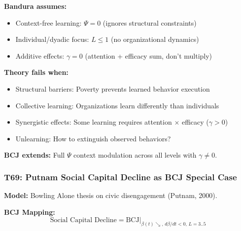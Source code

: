 \begin{tcolorbox}[colback=red!5!white, colframe=red!75!black,
    title=Boundary Condition: Where Bandura Fails]
\textbf{Bandura assumes:}
\begin{itemize}[nosep]
\item Context-free learning: $\Psi = 0$ (ignores structural constraints)
\item Individual/dyadic focus: $L \leq 1$ (no organizational dynamics)
\item Additive effects: $\gamma = 0$ (attention + efficacy sum, don't multiply)
\end{itemize}

\textbf{Theory fails when:}
\begin{itemize}[nosep]
\item Structural barriers: Poverty prevents learned behavior execution
\item Collective learning: Organizations learn differently than individuals
\item Synergistic effects: Some learning requires attention $\times$ efficacy ($\gamma > 0$)
\item Unlearning: How to extinguish observed behaviors?
\end{itemize}

\textbf{BCJ extends:} Full $\Psi$ context modulation across all levels with $\gamma \neq 0$.
\end{tcolorbox}

\subsubsection*{T69: Putnam Social Capital Decline as BCJ Special Case}

\textbf{Model:} Bowling Alone thesis on civic disengagement (Putnam, 2000).

\textbf{BCJ Mapping:}
\begin{equation}
\text{Social Capital Decline} = \text{BCJ} \big|_{\beta(t) \searrow, \, d\beta/dt < 0, \, L = 3..5}
\end{equation}

